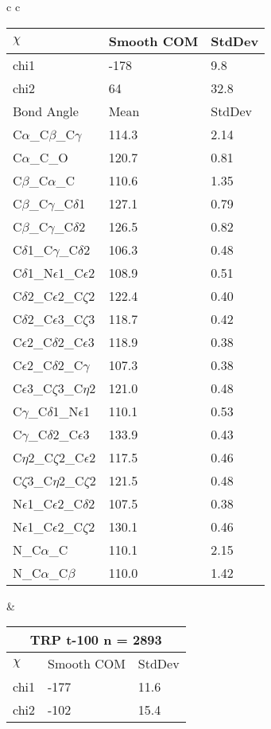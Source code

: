 \begin{longtable}{ c c }
\begin{tabular}{ l l l }
  $\chi$       & Smooth COM & StdDev \\ \midrule
  chi1 & -178 & 9.8 \\ 
  chi2 & 64 & 32.8 \\ \midrule
  Bond Angle   & Mean     & StdDev \\ \midrule
  C$\alpha$\_C$\beta$\_C$\gamma$ & 114.3 & 2.14\\
  C$\alpha$\_C\_O & 120.7 & 0.81\\
  C$\beta$\_C$\alpha$\_C & 110.6 & 1.35\\
  C$\beta$\_C$\gamma$\_C$\delta$1 & 127.1 & 0.79\\
  C$\beta$\_C$\gamma$\_C$\delta$2 & 126.5 & 0.82\\
  C$\delta$1\_C$\gamma$\_C$\delta$2 & 106.3 & 0.48\\
  C$\delta$1\_N$\epsilon$1\_C$\epsilon$2 & 108.9 & 0.51\\
  C$\delta$2\_C$\epsilon$2\_C$\zeta$2 & 122.4 & 0.40\\
  C$\delta$2\_C$\epsilon$3\_C$\zeta$3 & 118.7 & 0.42\\
  C$\epsilon$2\_C$\delta$2\_C$\epsilon$3 & 118.9 & 0.38\\
  C$\epsilon$2\_C$\delta$2\_C$\gamma$ & 107.3 & 0.38\\
  C$\epsilon$3\_C$\zeta$3\_C$\eta$2 & 121.0 & 0.48\\
  C$\gamma$\_C$\delta$1\_N$\epsilon$1 & 110.1 & 0.53\\
  C$\gamma$\_C$\delta$2\_C$\epsilon$3 & 133.9 & 0.43\\
  C$\eta$2\_C$\zeta$2\_C$\epsilon$2 & 117.5 & 0.46\\
  C$\zeta$3\_C$\eta$2\_C$\zeta$2 & 121.5 & 0.48\\
  N$\epsilon$1\_C$\epsilon$2\_C$\delta$2 & 107.5 & 0.38\\
  N$\epsilon$1\_C$\epsilon$2\_C$\zeta$2 & 130.1 & 0.46\\
  N\_C$\alpha$\_C & 110.1 & 2.15\\
  N\_C$\alpha$\_C$\beta$ & 110.0 & 1.42\\
  \bottomrule
  \end{tabular}
  &
  \begin{tabular}{ l l l }
  \toprule
  \multicolumn{3}{c}{TRP \textbf{t-100} n = 2893} \\ \toprule
  $\chi$       & Smooth COM & StdDev \\ \midrule
  chi1 & -177 & 11.6 \\ 
  chi2 & -102 & 15.4 \\ \midrule

\end{tabular}
\end{longtable}
